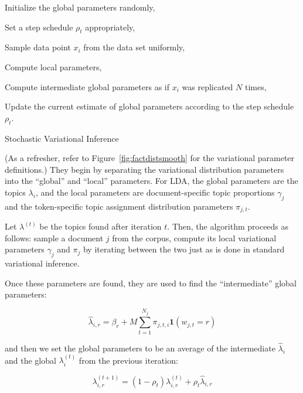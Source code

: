 \documentclass[11pt]{article}
\begin{document}
\begin{algorithm}
  \begin{algorithmic}
    \State Initialize the global parameters randomly,

    \State Set a step schedule $\rho_t$ appropriately,

    \Repeat

      Sample data point $x_i$ from the data set uniformly,

      Compute local parameters,

      Compute intermediate global parameters as if $x_i$ was replicated $N$
      times,

      Update the current estimate of global parameters according to the
      step schedule $\rho_t$.
  \end{algorithmic}
  \caption{Stochastic Variational Inference}
  \label{alg:svi}
\end{algorithm}


(As a refresher, refer to Figure~\ref{fig:factdistsmooth} for the
variational parameter definitions.) They begin by separating the
variational distribution parameters into the ``global'' and ``local''
parameters. For LDA, the global parameters are the topics $\lambda_{i}$,
and the local parameters are document-specific topic proportions $\gamma_j$
and the token-specific topic assignment distribution parameters $\pi_{j,t}$.

Let $\lambda^{(t)}$ be the topics found after iteration $t$. Then, the
algorithm proceeds as follows: sample a document $j$ from the corpus,
compute its local variational parameters $\gamma_j$ and $\pi_j$ by
iterating between the two just as is done in standard variational
inference.

Once these parameters are found, they are used to find the ``intermediate''
global parameters:

\begin{equation}
\hat{\lambda}_{i,r} = \beta_r + M \sum_{t=1}^{N_j}
\pi_{j,t,i}\mathbf{1}(w_{j,t} = r)
\end{equation}

and then we set the global parameters to be an average of the intermediate
$\hat{\lambda}_i$ and the global $\lambda_i^{(t)}$ from the previous
iteration:

\begin{equation}
  \lambda_{i,r}^{(t+1)} = (1-\rho_t)\lambda_{i,r}^{(t)} +
  \rho_t\hat{\lambda}_{i,r}
\end{equation}
\end{document}
